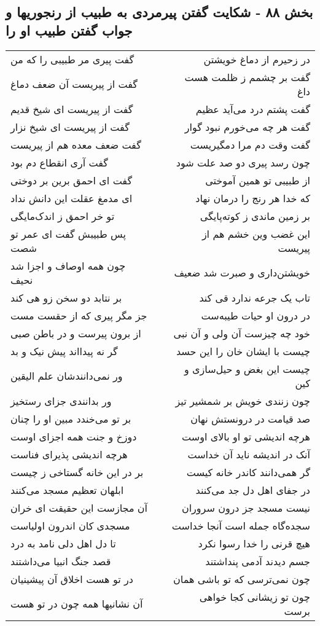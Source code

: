 \begin{center}
\section*{بخش ۸۸ - شکایت گفتن پیرمردی به طبیب از رنجوریها و جواب گفتن طبیب او را}
\label{sec:sh088}
\begin{longtable}{l p{0.5cm} r}
گفت پیری مر طبیبی را که من
&&
در زحیرم از دماغ خویشتن
\\
گفت از پیریست آن ضعف دماغ
&&
گفت بر چشمم ز ظلمت هست داغ
\\
گفت از پیریست ای شیخ قدیم
&&
گفت پشتم درد می‌آید عظیم
\\
گفت از پیریست ای شیخ نزار
&&
گفت هر چه می‌خورم نبود گوار
\\
گفت ضعف معده هم از پیریست
&&
گفت وقت دم مرا دمگیریست
\\
گفت آری انقطاع دم بود
&&
چون رسد پیری دو صد علت شود
\\
گفت ای احمق برین بر دوختی
&&
از طبیبی تو همین آموختی
\\
ای مدمغ عقلت این دانش نداد
&&
که خدا هر رنج را درمان نهاد
\\
تو خر احمق ز اندک‌مایگی
&&
بر زمین ماندی ز کوته‌پایگی
\\
پس طبیبش گفت ای عمر تو شصت
&&
این غضب وین خشم هم از پیریست
\\
چون همه اوصاف و اجزا شد نحیف
&&
خویشتن‌داری و صبرت شد ضعیف
\\
بر نتابد دو سخن زو هی کند
&&
تاب یک جرعه ندارد قی کند
\\
جز مگر پیری که از حقست مست
&&
در درون او حیات طیبه‌ست
\\
از برون پیرست و در باطن صبی
&&
خود چه چیزست آن ولی و آن نبی
\\
گر نه پیدااند پیش نیک و بد
&&
چیست با ایشان خان را این حسد
\\
ور نمی‌دانندشان علم الیقین
&&
چیست این بغض و حیل‌سازی و کین
\\
ور بدانندی جزای رستخیز
&&
چون زنندی خویش بر شمشیر تیز
\\
بر تو می‌خندد مبین او را چنان
&&
صد قیامت در درونستش نهان
\\
دوزخ و جنت همه اجزای اوست
&&
هرچه اندیشی تو او بالای اوست
\\
هرچه اندیشی پذیرای فناست
&&
آنک در اندیشه ناید آن خداست
\\
بر در این خانه گستاخی ز چیست
&&
گر همی‌دانند کاندر خانه کیست
\\
ابلهان تعظیم مسجد می‌کنند
&&
در جفای اهل دل جد می‌کنند
\\
آن مجازست این حقیقت ای خران
&&
نیست مسجد جز درون سروران
\\
مسجدی کان اندرون اولیاست
&&
سجده‌گاه جمله است آنجا خداست
\\
تا دل اهل دلی نامد به درد
&&
هیچ قرنی را خدا رسوا نکرد
\\
قصد جنگ انبیا می‌داشتند
&&
جسم دیدند آدمی پنداشتند
\\
در تو هست اخلاق آن پیشینیان
&&
چون نمی‌ترسی که تو باشی همان
\\
آن نشانیها همه چون در تو هست
&&
چون تو زیشانی کجا خواهی برست
\\
\end{longtable}
\end{center}
